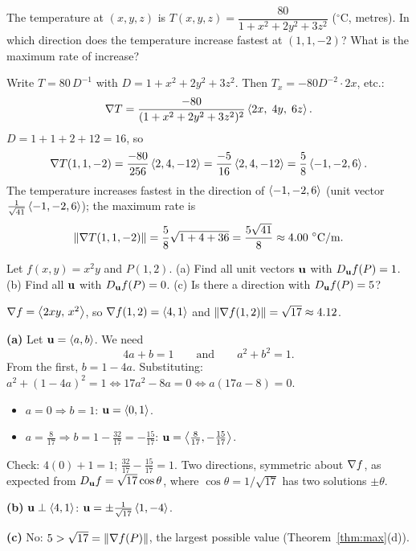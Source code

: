 \begin{example}\label{ex:temp3}
The temperature at $(x,y,z)$ is $T(x,y,z)=\dfrac{80}{1+x^2+2y^2+3z^2}$
($^\circ$C, metres). In which direction does the temperature increase fastest at
$(1,1,-2)$? What is the maximum rate of increase?
\end{example}
\begin{solution}
 Write $T=80\,D^{-1}$ with $D=1+x^2+2y^2+3z^2$. Then
$T_x=-80D^{-2}\cdot2x$, etc.:
\[
  \nabla T=\frac{-80}{(1+x^2+2y^2+3z^2)^2}\left\langle 2x,\;4y,\;6z \right\rangle.
\]
 $D=1+1+2+12=16$, so
\[
  \nabla T(1,1,-2)=\frac{-80}{256}\left\langle 2,4,-12 \right\rangle=\frac{-5}{16}\left\langle 2,4,-12 \right\rangle=\frac58\left\langle -1,-2,6 \right\rangle.
\]
 The temperature increases fastest in the direction of
$\left\langle -1,-2,6 \right\rangle$ (unit vector $\frac{1}{\sqrt{41}}\left\langle -1,-2,6 \right\rangle$); the maximum rate is
\[
  \norm{\grad T(1,1,-2)}=\frac58\sqrt{1+4+36}=\frac{5\sqrt{41}}{8}\approx4.00\ ^\circ\text{C/m}.
\]
\end{solution}

\begin{example}\label{ex:prescribed}
Let $f(x,y)=x^2y$ and $P(1,2)$.
(a) Find all unit vectors $\mathbf{u}$ with $D_{\mathbf{u}} f(P)=1$.
(b) Find all $\mathbf{u}$ with $D_{\mathbf{u}} f(P)=0$.
(c) Is there a direction with $D_{\mathbf{u}} f(P)=5$?
\end{example}
\begin{solution}
 $\nabla f=\left\langle 2xy,\,x^2 \right\rangle$, so $\nabla f(1,2)=\left\langle 4,1 \right\rangle$ and
$\lVert\nabla f(1,2)\rVert=\sqrt{17}\approx4.12$.

\textbf{(a)} Let $\mathbf{u}=\left\langle a,b \right\rangle$. We need
\[
  4a+b=1\qquad\text{and}\qquad a^2+b^2=1 .
\]
From the first, $b=1-4a$. Substituting: $a^2+(1-4a)^2=1\iff17a^2-8a=0\iff a(17a-8)=0$.
\begin{itemize}
  \item $a=0\Rightarrow b=1$: $\mathbf{u}=\left\langle 0,1 \right\rangle$.
  \item $a=\frac{8}{17}\Rightarrow b=1-\frac{32}{17}=-\frac{15}{17}$: $\mathbf{u}=\left\langle \frac{8}{17},-\frac{15}{17} \right\rangle$.
\end{itemize}
Check: $4(0)+1=1$\checkok; $\frac{32}{17}-\frac{15}{17}=1$\checkok. Two directions,
symmetric about $\nabla f$, as expected from $D_{\mathbf{u}} f=\sqrt{17}\cos\theta$, where
$\cos\theta=1/\sqrt{17}$ has two solutions $\pm\theta$.

\textbf{(b)} $\mathbf{u}\perp\left\langle 4,1 \right\rangle$: $\mathbf{u}=\pm\frac{1}{\sqrt{17}}\left\langle 1,-4 \right\rangle$.

\textbf{(c)} No: $5>\sqrt{17}=\lVert\nabla f(P)\rVert$, the largest possible value
(Theorem~\ref{thm:max}(d)).
\end{solution}

